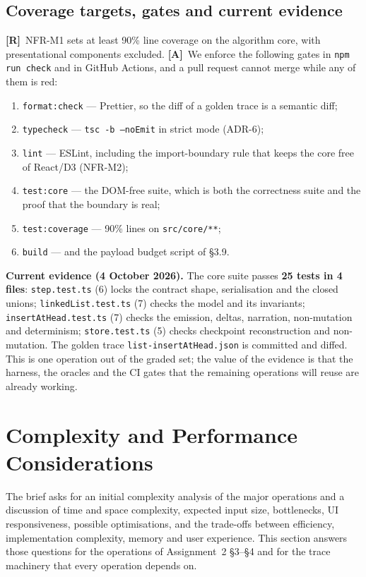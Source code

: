 \documentclass[11pt,a4paper]{article}
\newcommand{\R}{\textcolor{reqc}{\textbf{[R]}}}     %
\newcommand{\A}{\textcolor{asmc}{\textbf{[A]}}}     %
\newcommand{\ct}[1]{\texttt{#1}}
\begin{document}
\subsection{Coverage targets, gates and current evidence}

\R\ NFR-M1 sets at least 90\% line coverage on the algorithm core, with presentational
components excluded. \A\ We enforce the following gates in \ct{npm run check} and in GitHub
Actions, and a pull request cannot merge while any of them is red:

\begin{enumerate}[leftmargin=1.6em,topsep=2pt,itemsep=1pt]
  \item \ct{format:check} --- Prettier, so the diff of a golden trace is a semantic diff;
  \item \ct{typecheck} --- \ct{tsc -b --noEmit} in strict mode (ADR-6);
  \item \ct{lint} --- ESLint, including the import-boundary rule that keeps the core free of
        React/D3 (NFR-M2);
  \item \ct{test:core} --- the DOM-free suite, which is both the correctness suite and the
        proof that the boundary is real;
  \item \ct{test:coverage} --- 90\% lines on \ct{src/core/**};
  \item \ct{build} --- and the payload budget script of \S3.9.
\end{enumerate}

\noindent\textbf{Current evidence (4 October 2026).} The core suite passes
\textbf{25 tests in 4 files}: \ct{step.test.ts} (6) locks the contract shape, serialisation
and the closed unions; \ct{linkedList.test.ts} (7) checks the model and its invariants;
\ct{insertAtHead.test.ts} (7) checks the emission, deltas, narration, non-mutation and
determinism; \ct{store.test.ts} (5) checks checkpoint reconstruction and non-mutation. The
golden trace \ct{list-insertAtHead.json} is committed and diffed. This is one operation out
of the graded set; the value of the evidence is that the harness, the oracles and the CI
gates that the remaining operations will reuse are already working.

\section{Complexity and Performance Considerations}

The brief asks for an initial complexity analysis of the major operations and a discussion of
time and space complexity, expected input size, bottlenecks, UI responsiveness, possible
optimisations, and the trade-offs between efficiency, implementation complexity, memory and
user experience. This section answers those questions for the operations of Assignment~2
\S3--\S4 and for the trace machinery that every operation depends on.
\end{document}
